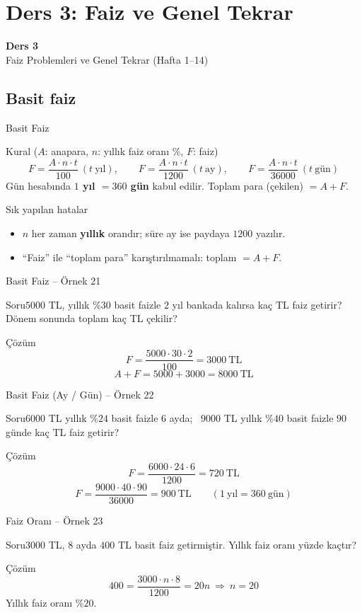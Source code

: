 \documentclass[aspectratio=169,11pt,handout]{beamer}
\newcommand{\soru}[3]{%
\begin{frame}{#1}
  \begin{block}{Soru}\large #2\end{block}
  \pause
  \begin{exampleblock}{Çözüm}\large #3\end{exampleblock}
\end{frame}}
\begin{document}
\section{Ders 3: Faiz ve Genel Tekrar}
\begin{frame}
\centering\Large\color{anamavi}\textbf{Ders 3}\\[6pt]\normalsize Faiz Problemleri ve Genel Tekrar (Hafta 1--14)
\end{frame}

\subsection{Basit faiz}
\begin{frame}{Basit Faiz}
\begin{block}{Kural (\(A\): anapara, \(n\): yıllık faiz oranı \%, \(F\): faiz)}
\[F=\frac{A\cdot n\cdot t}{100}\ (t\ \text{yıl}),\qquad F=\frac{A\cdot n\cdot t}{1200}\ (t\ \text{ay}),\qquad F=\frac{A\cdot n\cdot t}{36000}\ (t\ \text{gün})\]
Gün hesabında \textbf{\(1\) yıl \(=360\) gün} kabul edilir. \qquad Toplam para (çekilen) \(=A+F\).
\end{block}
\begin{alertblock}{Sık yapılan hatalar}
\begin{itemize}
\item \(n\) her zaman \textbf{yıllık} orandır; süre ay ise paydaya \(1200\) yazılır.
\item ``Faiz'' ile ``toplam para'' karıştırılmamalı: toplam \(=A+F\).
\end{itemize}
\end{alertblock}
\end{frame}

\soru{Basit Faiz -- Örnek 21}
{\(5000\) TL, yıllık \(\%30\) basit faizle \(2\) yıl bankada kalırsa kaç TL faiz getirir? Dönem sonunda toplam kaç TL çekilir?}
{\[F=\frac{5000\cdot 30\cdot 2}{100}=3000\ \text{TL}\]
\[A+F=5000+3000=8000\ \text{TL}\]}

\soru{Basit Faiz (Ay / Gün) -- Örnek 22}
{\(6000\) TL yıllık \(\%24\) basit faizle \(6\) ayda; \ \(9000\) TL yıllık \(\%40\) basit faizle \(90\) günde kaç TL faiz getirir?}
{\[F=\frac{6000\cdot 24\cdot 6}{1200}=720\ \text{TL}\]
\[F=\frac{9000\cdot 40\cdot 90}{36000}=900\ \text{TL}\qquad(1\ \text{yıl}=360\ \text{gün})\]}

\soru{Faiz Oranı -- Örnek 23}
{\(3000\) TL, \(8\) ayda \(400\) TL basit faiz getirmiştir. Yıllık faiz oranı yüzde kaçtır?}
{\[400=\frac{3000\cdot n\cdot 8}{1200}=20n\ \Rightarrow\ n=20\]
Yıllık faiz oranı \(\%20\).}
\end{document}
